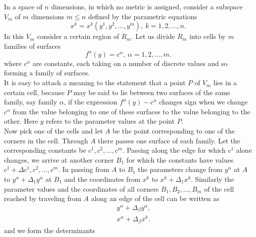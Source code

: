 In a space of $n$ dimensions, in which no metric is assigned, consider a subspace $V_m$ of $m$ dimensions $m\le n$ defined by the parametric equations
$$x^k = x^k(y^1, y^2, ..., y^m),~ k = 1, 2, ..., n.$$ In this $V_m$ consider a certain region of $R_m$. Let us divide $R_m$ into cells by $m$ families of surfaces
$$f^\alpha(y) = c^\alpha,~ \alpha = 1, 2, ..., m.$$ where $c^\alpha$ are constants, each taking on a number of discrete values and so forming a family of surfaces.\\

It is easy to attach a meaning to the statement that a point $P$ of $V_m$ lies in a certain cell, because $P$ may be said to lie between two surfaces of the same 
family, say family $\alpha$, if the expression $f^\alpha(y) - c^\alpha$ changes sign when we change $c^\alpha$ from the value belonging to one of these surfaces to 
the value belonging to the other. Here $y$ refers to the parameter values at the point $P$.\\

Now pick one of the cells and let $A$ be the point corresponding to one of the corners in the cell. Through $A$ there passes one surface of each family. Let the 
corresponding constants be $c^1, c^2, ..., c^m$. Passing along the edge for which $c^1$ alone changes, we arrive at another corner $B_1$ for which the constants
have values $c^1 + \Delta c^1, c^2, ..., c^m$. In passing from $A$ to $B_1$ the parameters change from $y^\alpha$ at $A$ to $y^\alpha + \Delta_1 y^\alpha$ at $B_1$
and the coordinates from $x^k$ to $x^k + \Delta_1 x^k$. Similarly the parameter values and the coordinates of all corners $B_1, B_2, ..., B_m$ of the cell reached by
traveling from $A$ along an edge of the cell can be written as 
\begin{eqnarray*}
&& y^\alpha + \Delta_\beta y^\alpha,\\
&&x^\alpha + \Delta_\beta x^k.
\end{eqnarray*} and we form the determinants 

